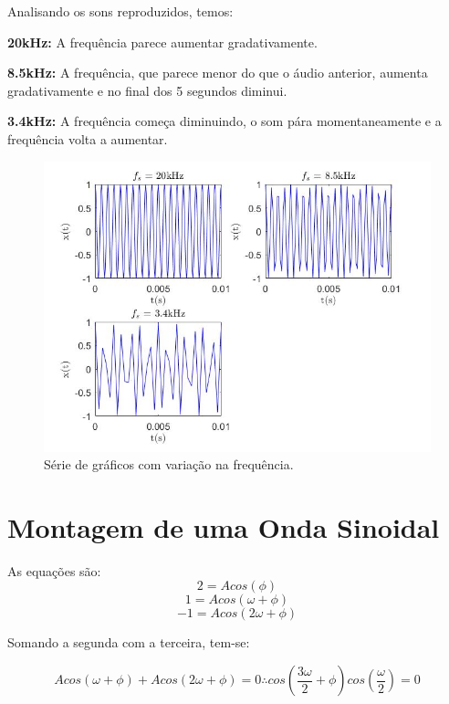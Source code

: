 \documentclass[a4paper, 12pt]{article}
\begin{document}
Analisando os sons reproduzidos, temos:

\textbf{20kHz:} A frequência parece aumentar gradativamente. 

\textbf{8.5kHz:} A frequência, que parece menor do que o áudio anterior, aumenta gradativamente e no final dos 5 segundos diminui.

\textbf{3.4kHz:} A frequência começa diminuindo, o som pára momentaneamente e a frequência volta a aumentar.



\begin{figure}[H]
	\centering
	\includegraphics[scale=0.5]{../Imagens/ex3/b.jpg} 
	\caption{Série de gráficos com variação na frequência.}
	\label{fig:3b}
\end{figure}

\section{Montagem de uma Onda Sinoidal}

As equações são:
$$2=Acos(\phi)$$
$$1=Acos(\omega +\phi)$$
$$-1=Acos(2\omega +\phi)$$

Somando a segunda com a terceira, tem-se:

$$Acos(\omega +\phi) + Acos(2\omega +\phi) = 0 \therefore cos(\frac{3\omega}{2} + \phi)cos(\frac{\omega}{2})=0$$
\end{document}

